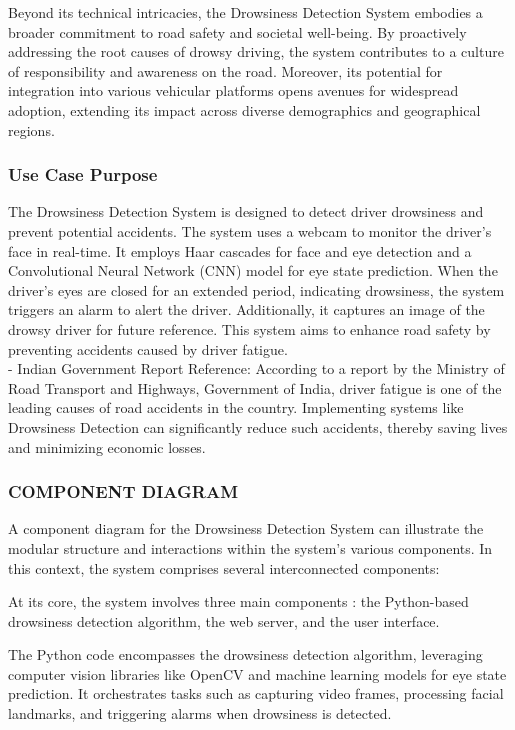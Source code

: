 \documentclass[12pt]{article}
\begin{document}
Beyond its technical intricacies, the Drowsiness Detection System embodies a broader commitment to road safety and societal well-being. By proactively addressing the root causes of drowsy driving, the system contributes to a culture of responsibility and awareness on the road. Moreover, its potential for integration into various vehicular platforms opens avenues for widespread adoption, extending its impact across diverse demographics and geographical regions.

\subsubsection{Use Case Purpose}

The Drowsiness Detection System is designed to detect driver drowsiness and prevent potential accidents. The system uses a webcam to monitor the driver's face in real-time. It employs Haar cascades for face and eye detection and a Convolutional Neural Network (CNN) model for eye state prediction. When the driver's eyes are closed for an extended period, indicating drowsiness, the system triggers an alarm to alert the driver. Additionally, it captures an image of the drowsy driver for future reference. This system aims to enhance road safety by preventing accidents caused by driver fatigue.\\

- Indian Government Report Reference: According to a report by the Ministry of Road Transport and Highways, Government of India, driver fatigue is one of the leading causes of road accidents in the country. Implementing systems like Drowsiness Detection can significantly reduce such accidents, thereby saving lives and minimizing economic losses.

\subsubsection{COMPONENT DIAGRAM }
A component diagram for the Drowsiness Detection System can illustrate the modular structure and interactions within the system's various components. In this context, the system comprises several interconnected components: 

At its core, the system involves three main components : the Python-based drowsiness detection algorithm, the web server, and the user interface. 

The Python code encompasses the drowsiness detection algorithm, leveraging computer vision libraries like OpenCV and machine learning models for eye state prediction. It orchestrates tasks such as capturing video frames, processing facial landmarks, and triggering alarms when drowsiness is detected. 
\end{document}
